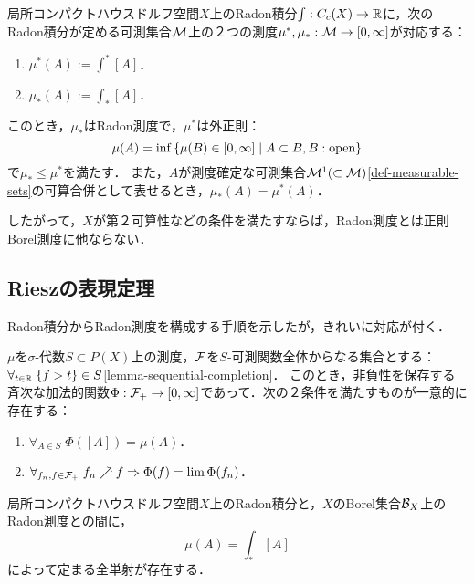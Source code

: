\documentclass[uplatex,dvipdfmx]{jsreport}
\begin{document}
\begin{proposition}
    局所コンパクトハウスドルフ空間$X$上のRadon積分$\int:C_c(X)\to\mathbb{R}$に，次のRadon積分が定める可測集合$\mathcal{M}$上の２つの測度$\mu^*,\mu_*:\mathcal{M}\to[0,\infty]$が対応する：
    \begin{enumerate}
        \item $\mu^*(A):=\int^*[A]$．
        \item $\mu_*(A):=\int_*[A]$．
    \end{enumerate}
    このとき，$\mu_*$はRadon測度で，$\mu^*$は外正則：
    \[\mu(A)=\inf\left\{\mu(B)\in[0,\infty]\mid A\subset B,B:\text{open}\right\}\]
    で$\mu_*\le\mu^*$を満たす．
    また，$A$が測度確定な可測集合$\mathcal{M}^1(\subset\mathcal{M})$\ref{def-measurable-sets}の可算合併として表せるとき，$\mu_*(A)=\mu^*(A)$．
\end{proposition}
\begin{remarks}
    したがって，$X$が第２可算性などの条件を満たすならば，Radon測度とは正則Borel測度に他ならない．
\end{remarks}

\subsection{Rieszの表現定理}

\begin{tcolorbox}[colframe=ForestGreen, colback=ForestGreen!10!white,breakable,colbacktitle=ForestGreen!40!white,coltitle=black,fonttitle=\bfseries\sffamily,
title=]
    Radon積分からRadon測度を構成する手順を示したが，きれいに対応が付く．
\end{tcolorbox}

\begin{lemma}
    $\mu$を$\sigma$-代数$S\subset P(X)$上の測度，$\mathcal{F}$を$S$-可測関数全体からなる集合とする：$\forall_{t\in\mathbb{R}}\;\{f>t\}\in S$\ref{lemma-sequential-completion}．
    このとき，非負性を保存する斉次な加法的関数$\Phi:\mathcal{F}_+\to[0,\infty]$であって．次の２条件を満たすものが一意的に存在する：
    \begin{enumerate}
        \item $\forall_{A\in S}\;\Phi([A])=\mu(A)$．
        \item $\forall_{f_n,f\in\mathcal{F}_+}\;f_n\nearrow f\Rightarrow\Phi(f)=\lim\Phi(f_n)$．
    \end{enumerate}
\end{lemma}

\begin{theorem}
    局所コンパクトハウスドルフ空間$X$上のRadon積分と，$X$のBorel集合$\mathcal{B}_X$上のRadon測度との間に，
    \[\mu(A)=\int_*[A]\]
    によって定まる全単射が存在する．
\end{theorem}
\end{document}

